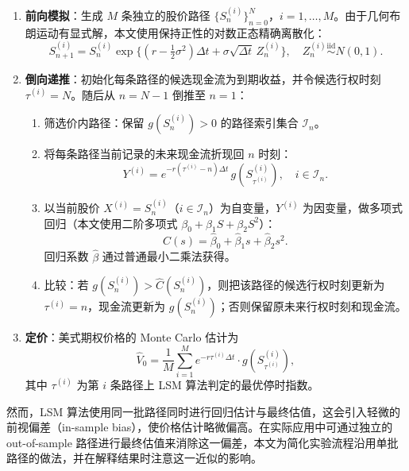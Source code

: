 \begin{enumerate}
  \item \textbf{前向模拟}：生成 $M$ 条独立的股价路径 $\{S_n^{(i)}\}_{n=0}^{N}$，$i = 1, \dots, M$。由于几何布朗运动有显式解，本文使用保持正性的对数正态精确离散化：
  \begin{equation}\label{eq:em}
    S_{n+1}^{(i)} = S_n^{(i)} \exp\Big\{(r-\tfrac{1}{2}\sigma^2)\Delta t
    + \sigma\sqrt{\Delta t}\, Z_n^{(i)}\Big\},
    \quad Z_n^{(i)} \stackrel{\text{iid}}{\sim} N(0, 1).
  \end{equation}
  \item \textbf{倒向递推}：初始化每条路径的候选现金流为到期收益，并令候选行权时刻 $\tau^{(i)}=N$。随后从 $n = N-1$ 倒推至 $n = 1$：
  \begin{enumerate}
    \item 筛选价内路径：保留 $g(S_n^{(i)}) > 0$ 的路径索引集合 $\mathcal{I}_n$。
    \item 将每条路径当前记录的未来现金流折现回 $n$ 时刻：
    \begin{equation}
      Y^{(i)} = e^{-r(\tau^{(i)}-n)\Delta t}\, g(S_{\tau^{(i)}}^{(i)}),
      \quad i\in \mathcal{I}_n.
    \end{equation}
    \item 以当前股价 $X^{(i)} = S_n^{(i)}$（$i \in \mathcal{I}_n$）为自变量，$Y^{(i)}$ 为因变量，做多项式回归（本文使用二阶多项式 $\beta_0 + \beta_1 S + \beta_2 S^2$）：
    \begin{equation}\label{eq:lsm_reg}
      \hat{C}(s) = \hat{\beta}_0 + \hat{\beta}_1 s + \hat{\beta}_2 s^2.
    \end{equation}
    回归系数 $\hat{\beta}$ 通过普通最小二乘法获得。
    \item 比较：若 $g(S_n^{(i)}) > \hat{C}(S_n^{(i)})$，则把该路径的候选行权时刻更新为 $\tau^{(i)}=n$，现金流更新为 $g(S_n^{(i)})$；否则保留原未来行权时刻和现金流。
  \end{enumerate}
  \item \textbf{定价}：美式期权价格的 Monte Carlo 估计为
  \begin{equation}\label{eq:lsm_price}
    \hat{V}_0 = \frac{1}{M} \sum_{i=1}^{M} e^{-r \tau^{(i)} \Delta t} \cdot g(S_{\tau^{(i)}}^{(i)}),
  \end{equation}
  其中 $\tau^{(i)}$ 为第 $i$ 条路径上 LSM 算法判定的最优停时指数。
\end{enumerate}

然而，LSM 算法使用同一批路径同时进行回归估计与最终估值，这会引入轻微的前视偏差（in-sample bias），使价格估计略微偏高。在实际应用中可通过独立的 out-of-sample 路径进行最终估值来消除这一偏差，本文为简化实验流程沿用单批路径的做法，并在解释结果时注意这一近似的影响。

